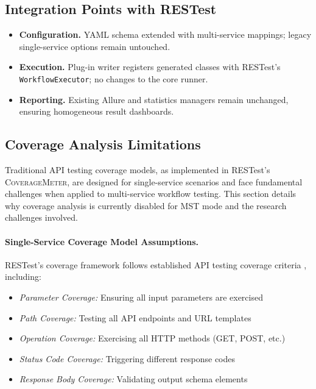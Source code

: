 \subsection{Integration Points with RESTest}
\begin{itemize}[leftmargin=*]
  \item \textbf{Configuration.}  YAML schema extended with multi-service
        mappings; legacy single-service options remain untouched.
  \item \textbf{Execution.}  Plug-in writer registers generated classes with
        RESTest’s \texttt{WorkflowExecutor}; no changes to the core runner.
  \item \textbf{Reporting.}  Existing Allure and statistics managers remain
        unchanged, ensuring homogeneous result dashboards.
\end{itemize}

\subsection{Coverage Analysis Limitations}\label{sec:coverage-limitations}

Traditional API testing coverage models, as implemented in RESTest's \textsc{CoverageMeter}, are designed for single-service scenarios and face fundamental challenges when applied to multi-service workflow testing. This section details why coverage analysis is currently disabled for MST mode and the research challenges involved.

\paragraph{Single-Service Coverage Model Assumptions.}
RESTest's coverage framework follows established API testing coverage criteria \cite{martin2019restest}, including:
\begin{itemize}[leftmargin=*]
    \item \textit{Parameter Coverage:} Ensuring all input parameters are exercised
    \item \textit{Path Coverage:} Testing all API endpoints and URL templates  
    \item \textit{Operation Coverage:} Exercising all HTTP methods (GET, POST, etc.)
    \item \textit{Status Code Coverage:} Triggering different response codes
    \item \textit{Response Body Coverage:} Validating output schema elements
\end{itemize}

